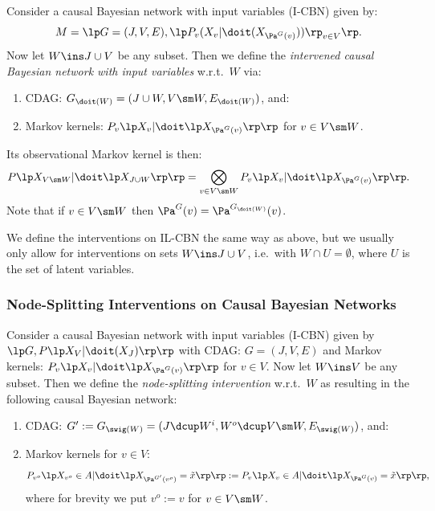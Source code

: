 \begin{Def}
    Consider a causal Bayesian network with input variables (I-CBN) given by: 
        \[ M= \lp G=(J,V,E), \lp P_v ( X_v|\doit( X_{\Pa^G(v)})) \rp_{v \in V} \rp. \]
    Now let  $ W \ins J \cup V$ be any subset.
    Then we define the \emph{intervened causal Bayesian network with input variables} w.r.t.\ $W$ via:
    \begin{enumerate}
        \item CDAG: $G_{\doit(W)} = (J \cup W, V \sm W, E_{\doit(W)}) $, and:
        \item Markov kernels: $P_v\lp X_v|\doit\lp X_{\Pa^G(v)}\rp\rp$ for $v \in V \sm W$.
    \end{enumerate}
    Its observational Markov kernel is then:
    \[ P\lp X_{V \sm W}|\doit\lp X_{J \cup W}\rp\rp = \bigotimes_{v \in V\sm W} P_v\lp X_v|\doit\lp X_{\Pa^G(v)}\rp\rp.  \]
    Note that if $ v\in V \sm W$ then $\Pa^G(v) = \Pa^{G_{\doit(W)}}(v)$.
\end{Def}

\begin{Rem}
We define the interventions on IL-CBN the same way as above, but we usually 
only allow for interventions on sets $W \ins J \cup V$, i.e.\ with $W \cap U = \emptyset$, where $U$ is the set of latent variables.
\end{Rem}

\subsubsection{Node-Splitting Interventions on Causal Bayesian Networks}

\begin{Def}
    Consider a causal Bayesian network with input variables (I-CBN) given by $\lp G, P\lp X_V|\doit(X_J)\rp\rp$ 
    with CDAG: $G=(J,V,E)$ and Markov kernels: $P_v\lp X_v|\doit\lp X_{\Pa^G(v)}\rp\rp$ for $v \in V$.
    Now let  $ W \ins V$ be any subset.
    Then we define the \emph{node-splitting intervention} w.r.t.\ $W$ as resulting in the following causal Bayesian network:
    \begin{enumerate}
        \item CDAG: $G':=G_{\swig(W)} = (J \dcup W^i, W^o \dcup V\sm W,E_{\swig(W)})$, and:
        \item Markov kernels for $v \in V$:
            \[ P_{v^o}\lp X_{v^o} \in A|\doit\lp X_{\Pa^{G'}(v^o)}=\tilde x\rp\rp := P_v\lp X_v \in A|\doit\lp X_{\Pa^G(v)}=\tilde x\rp\rp, \]
         where for brevity we put $v^o:=v$ for $v \in V \sm W$.
    \end{enumerate}
\end{Def}

